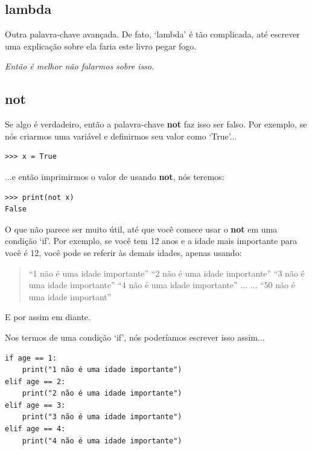 \subsection*{lambda}

Outra palavra-chave avançada. De fato, `lambda' é tão complicada, até escrever uma explicação sobre ela faria este livro pegar fogo.
\par
\emph{Então é melhor não falarmos sobre isso.}

\subsection*{not}

Se algo é verdadeiro, então a palavra-chave \textbf{not} faz isso ser falso. Por exemplo, se nós criarmos uma variável  e definirmos seu valor como `True'...

\begin{listing}
\begin{verbatim}
>>> x = True
\end{verbatim}
\end{listing}

...e então imprimirmos o valor de  usando \textbf{not}, nós teremos:

\begin{listing}
\begin{verbatim}
>>> print(not x)
False
\end{verbatim}
\end{listing}

O que não parece ser muito útil, até que você comece usar o \textbf{not} em uma condição `if'. Por exemplo, se você tem 12 anos e a idade mais importante para você é 12, você pode se referir às demais idades, apenas usando:

\begin{quotation}
``1 não é uma idade importante''
``2 não é uma idade importante''
``3 não é uma idade importante''
``4 não é uma idade importante''
...
...
``50 não é uma idade important''
\end{quotation}

E por assim em diante.
\par\noindent
Nos termos de uma condição `if', nós poderíamos escrever isso assim$\ldots$

\begin{listing}
\begin{verbatim}
if age == 1:
    print("1 não é uma idade importante")
elif age == 2:
    print("2 não é uma idade importante")
elif age == 3:
    print("3 não é uma idade importante")
elif age == 4:
    print("4 não é uma idade importante")
\end{verbatim}
\end{listing}


